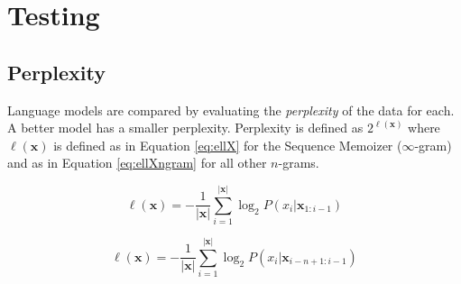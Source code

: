 \chapter{Testing}\label{chap:results}

\section{Perplexity}\label{sec:perplexity}

Language models are compared by evaluating the \textit{perplexity} of the data for each. A better model has a smaller perplexity. Perplexity is defined as $2^{\ell(\boldsymbol{x})}$ where $\ell(\boldsymbol{x})$ is defined as in Equation \ref{eq:ellX} for the Sequence Memoizer ($\infty$-gram) \cite{wood2011sequence} and as in Equation \ref{eq:ellXngram} for all other $n$-grams. %

%


\begin{equation}
\ell(\boldsymbol{x})=-\frac{1}{|\boldsymbol{x}|}\sum_{i=1}^{|\boldsymbol{x}|}\log_{2}P(x_{i}|\boldsymbol{x}_{1:i-1})
\label{eq:ellX}
\end{equation}

\begin{equation}
\ell(\boldsymbol{x})=-\frac{1}{|\boldsymbol{x}|}\sum_{i=1}^{|\boldsymbol{x}|}\log_{2}P(x_{i}|\boldsymbol{x}_{i-n+1:i-1})
\label{eq:ellXngram}
\end{equation}

